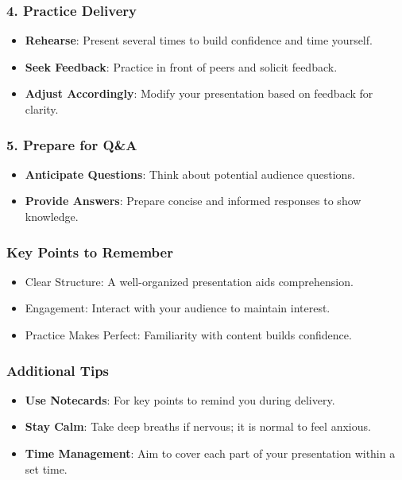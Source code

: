 \documentclass[aspectratio=169]{beamer}
\begin{document}
\begin{frame}[fragile]
    \frametitle{4. Practice Delivery}
    \begin{itemize}
        \item \textbf{Rehearse}: Present several times to build confidence and time yourself.
        \item \textbf{Seek Feedback}: Practice in front of peers and solicit feedback.
        \item \textbf{Adjust Accordingly}: Modify your presentation based on feedback for clarity.
    \end{itemize}
\end{frame}

\begin{frame}[fragile]
    \frametitle{5. Prepare for Q\&A}
    \begin{itemize}
        \item \textbf{Anticipate Questions}: Think about potential audience questions.
        \item \textbf{Provide Answers}: Prepare concise and informed responses to show knowledge.
    \end{itemize}
\end{frame}

\begin{frame}[fragile]
    \frametitle{Key Points to Remember}
    \begin{itemize}
        \item Clear Structure: A well-organized presentation aids comprehension.
        \item Engagement: Interact with your audience to maintain interest.
        \item Practice Makes Perfect: Familiarity with content builds confidence.
    \end{itemize}
\end{frame}

\begin{frame}[fragile]
    \frametitle{Additional Tips}
    \begin{itemize}
        \item \textbf{Use Notecards}: For key points to remind you during delivery.
        \item \textbf{Stay Calm}: Take deep breaths if nervous; it is normal to feel anxious.
        \item \textbf{Time Management}: Aim to cover each part of your presentation within a set time.
    \end{itemize}
\end{frame}
\end{document}

